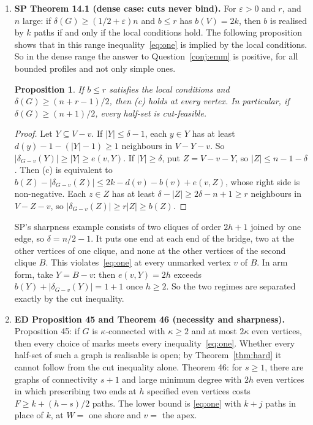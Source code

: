\documentclass[11pt]{amsart}
\newtheorem{proposition}[theorem]{Proposition}
\theoremstyle{definition}
\begin{document}
\begin{enumerate}
\item \textbf{SP Theorem 14.1 (dense case: cuts never bind).} For $\varepsilon>0$ and $r$, and $n$
large: if $\delta(G)\ge(1/2+\varepsilon)n$ and $b\le r$ has $b(V)=2k$, then $b$ is realised by $k$
paths if and only if the local conditions hold. The following proposition shows that in this range
inequality~\eqref{eq:one} is implied by the local conditions. So in the dense range the answer to
Question~\ref{conj:emm} is positive, for all bounded profiles and not only simple ones.

\begin{proposition}\label{prop:dense}
If $b\le r$ satisfies the local conditions and $\delta(G)\ge(n+r-1)/2$, then (c) holds at every
vertex. In particular, if $\delta(G)\ge(n+1)/2$, every half-set is cut-feasible.
\end{proposition}

\begin{proof}
Let $Y\subseteq V-v$. If $|Y|\le\delta-1$, each $y\in Y$ has at least $d(y)-1-(|Y|-1)\ge 1$
neighbours in $V-Y-v$. So $|\delta_{G-v}(Y)|\ge|Y|\ge e(v,Y)$. If $|Y|\ge\delta$, put $Z=V-v-Y$, so
$|Z|\le n-1-\delta$. Then (c) is equivalent to
$b(Z)-|\delta_{G-v}(Z)|\le 2k-d(v)-b(v)+e(v,Z)$, whose right side is non-negative. Each $z\in Z$ has
at least $\delta-|Z|\ge 2\delta-n+1\ge r$ neighbours in $V-Z-v$, so $|\delta_{G-v}(Z)|\ge r|Z|\ge
b(Z)$.
\end{proof}

SP's sharpness example consists of two cliques of order $2h+1$ joined by one edge, so $\delta=n/2-1$.
It puts one end at each end of the bridge, two at the other vertices of one clique, and none at the
other vertices of the second clique $B$. This violates~\eqref{eq:one} at every unmarked vertex $v$ of $B$. In arm form, take $Y=B-v$: then
$e(v,Y)=2h$ exceeds $b(Y)+|\delta_{G-v}(Y)|=1+1$ once $h\ge2$. So the two regimes are separated exactly
by the cut inequality.

\item \textbf{ED Proposition 45 and Theorem 46 (necessity and sharpness).} Proposition 45: if $G$ is
$\kappa$-connected with $\kappa\ge2$ and at most $2\kappa$ even vertices, then every choice of marks
meets every inequality~\eqref{eq:one}. Whether every half-set of such a graph is realisable is open;
by Theorem~\ref{thm:hard} it cannot follow from the cut inequality alone. Theorem 46: for $s\ge1$, there are graphs of connectivity $s+1$ and large
minimum degree with $2h$ even vertices in which prescribing two ends at $h$ specified even vertices
costs $F\ge k+(h-s)/2$ paths. The lower bound is \eqref{eq:one} with $k+j$ paths in place of $k$, at
$W=$ one shore and $v=$ the apex.


\end{enumerate}
\end{document}
